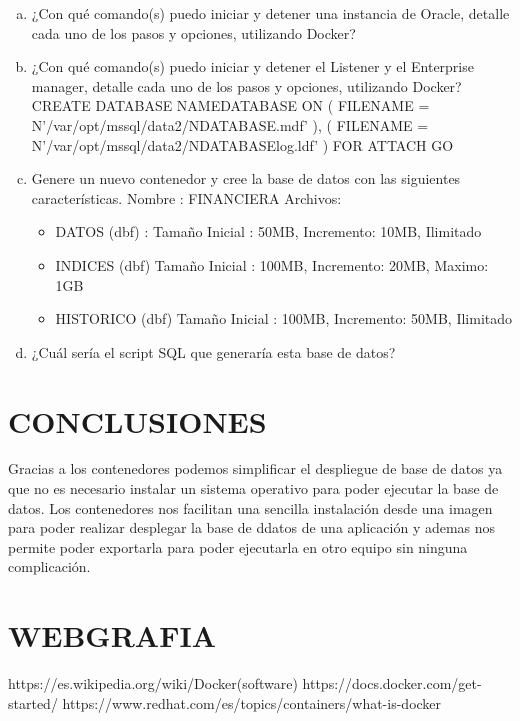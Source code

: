 \documentclass[preprint,12pt]{elsarticle}
\begin{document}
\begin{enumerate}[a)]
\item ¿Con qué comando(s) puedo iniciar y detener una instancia de Oracle, detalle cada uno de los pasos y opciones, utilizando Docker?\newline


\item ¿Con qué comando(s) puedo iniciar y detener el Listener y el Enterprise manager, detalle cada uno de los pasos y opciones, utilizando Docker?\newline
CREATE DATABASE NAMEDATABASE ON \newline
( FILENAME = N'/var/opt/mssql/data2/NDATABASE.mdf' ),\newline
( FILENAME = N'/var/opt/mssql/data2/NDATABASElog.ldf' )\newline
FOR ATTACH\newline
GO\newline
\item Genere un nuevo contenedor y cree la base de datos con las siguientes características.\newline
Nombre : FINANCIERA \newline
Archivos:
\begin{itemize}
\item DATOS (dbf) : Tamaño Inicial : 50MB, Incremento: 10MB, Ilimitado
\item INDICES (dbf) Tamaño Inicial : 100MB, Incremento: 20MB, Maximo: 1GB
\item HISTORICO (dbf) Tamaño Inicial : 100MB, Incremento: 50MB, Ilimitado
\end{itemize}
\item ¿Cuál sería el script SQL que generaría esta base de datos?
\begin{figure}[htb]
	\begin{center}
	\end{center}
\end{figure}
\end{enumerate}

\section{CONCLUSIONES}
Gracias a los contenedores podemos simplificar el despliegue de base de datos ya que no es necesario instalar un sistema operativo para poder ejecutar la base de datos. Los contenedores nos facilitan una sencilla instalación desde una imagen para poder realizar desplegar la base de ddatos de una aplicación y ademas nos permite poder exportarla para poder ejecutarla en otro equipo sin ninguna complicación.

\section{WEBGRAFIA}
https://es.wikipedia.org/wiki/Docker(software)\newline
https://docs.docker.com/get-started/\newline
https://www.redhat.com/es/topics/containers/what-is-docker\newline
\end{document}
